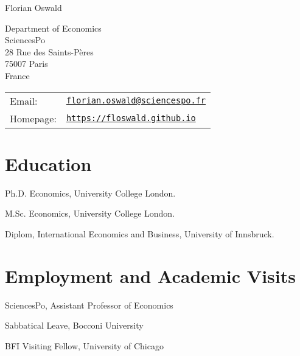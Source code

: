 \documentclass[letterpaper]{article}
\def\name{Florian Oswald}
\renewenvironment{itemize}{
  \begin{list}{}{
    \setlength{\leftmargin}{1.5em}
  }
}{
  \end{list}
}
\begin{document}
{\huge \name}


\vspace{0.25in}

\begin{minipage}{0.55\linewidth}
 Department of Economics\\
  SciencesPo\\
28 Rue des Saints-Pères \\ 
75007 Paris \\ 
France \\ 
\end{minipage}
\begin{minipage}{0.45\linewidth}
  \begin{tabular}{ll}
    Email: & \href{mailto:florian.oswald@sciencespo.fr}{\tt florian.oswald@sciencespo.fr} \\
    Homepage: & \href{https://floswald.github.io}{\tt https://floswald.github.io} \\
  \end{tabular}
\end{minipage}


\section*{Education}

\begin{itemize}
  \setlength{\itemindent}{26pt}
  \item[2015:] Ph.D. Economics, University College London.
   
  \item[2008:] M.Sc. Economics, University College London.

  \item[2006:] Diplom, International Economics and Business, University of Innsbruck.

\end{itemize}


\section*{Employment and Academic Visits}

\begin{itemize}
  \setlength{\itemindent}{26pt}
\item[2015--:] SciencesPo, Assistant Professor of Economics
\item[2021/2022:] Sabbatical Leave, Bocconi University
\item[May 2022:] BFI Visiting Fellow, University of Chicago
\end{itemize}
\end{document}
